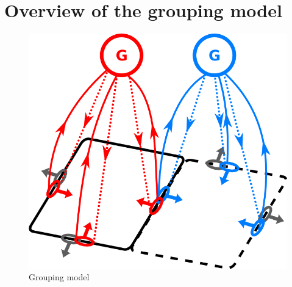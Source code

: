 \section{Overview of the grouping model}
\begin{figure}[htbp]
\centering
\includegraphics[width=\textwidth]{Intro/figs/groupingcircuit}
\makeatletter
\let\@currsize\normalsize
\caption{Grouping model}
\label{fig:GroupingModel}
\end{figure}


